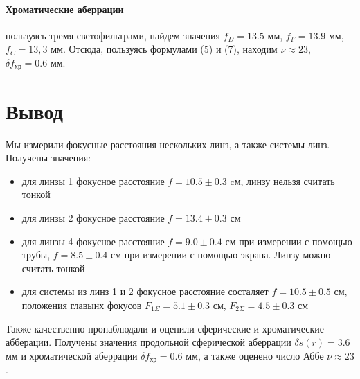 \documentclass[a4paper,12pt]{article}
\begin{document}
\newpage
\paragraph{Хроматические аберрации} пользуясь тремя светофильтрами, найдем значения $f_D = 13.5$ мм, $f_F = 13.9$ мм, $f_C = 13,3$ мм. Отсюда, пользуясь формулами (5) и (7), находим $\nu \approx 23$, $\delta f_\text{хр} = 0.6$ мм.


\section*{Вывод}
Мы измерили фокусные расстояния нескольких линз, а также системы линз. Получены значения:
\begin{itemize}
    \item для линзы 1 фокусное расстояние $f = 10.5 \pm 0.3$ cм, линзу нельзя считать тонкой
    \item для линзы 2 фокусное расстояние $f = 13.4 \pm 0.3$ см
    \item для линзы 4 фокусное расстояние $f = 9.0 \pm 0.4$ см при измерении с помощью трубы, $f = 8.5 \pm 0.4$ см при измерении с помощью экрана. Линзу можно считать тонкой
    \item для системы из линз 1 и 2 фокусное расстояние состаляет $f = 10.5 \pm 0.5$ см, положения главынх фокусов $F_{1\Sigma} = 5.1 \pm 0.3$ см, $F_{2\Sigma} = 4.5 \pm 0.3$ см
\end{itemize}
Также качественно пронаблюдали и оценили сферические и хроматические абберации. Получены значения продольной сферической аберрации $\delta s(r) = 3.6$ мм и хроматической аберрации $\delta f_\text{хр} = 0.6$ мм, а также оценено число Аббе $\nu \approx 23$.
\end{document}
